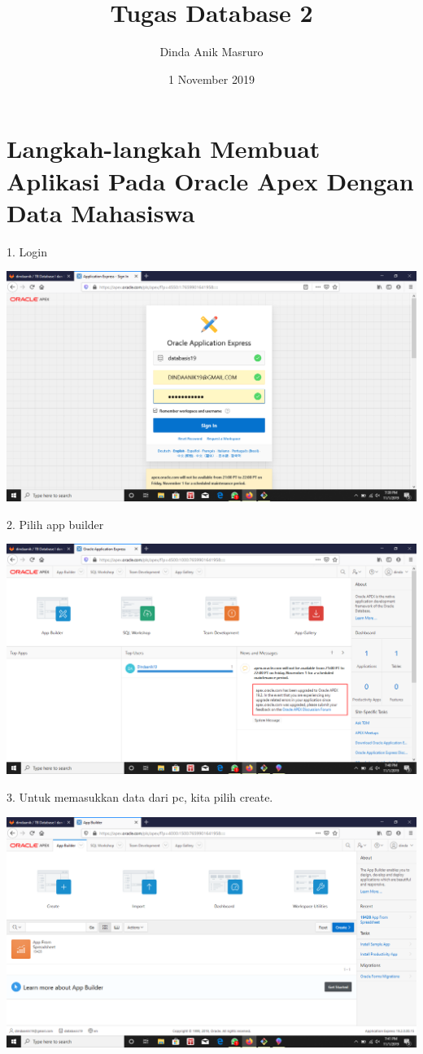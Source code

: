 \documentclass{article}
\title{Tugas Database 2}
\author{Dinda Anik Masruro}
\date{1 November 2019}
\begin{document}
\maketitle

\section{Langkah-langkah Membuat Aplikasi Pada Oracle Apex Dengan Data Mahasiswa}
\item 1. Login
\begin{center}
    \includegraphics[width=10cm\textwidth]{gambar/1.png}
\end{center}
\item 2. Pilih app builder
\begin{center}
 \includegraphics[width=10cm\textwidth]{gambar/2b.png}
\end{center}
\item 3. Untuk memasukkan data dari pc, kita pilih create.
\begin{center}
    \includegraphics[width=10cm\textwidth]{gambar/3.png}
 \end{center}
\end{document}
